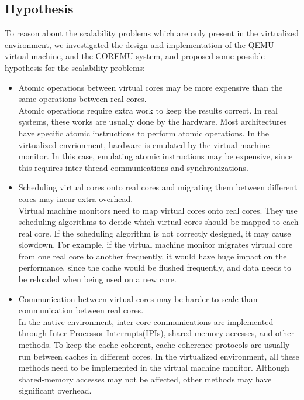 \subsection{Hypothesis}
To reason about the scalability problems which are only present in the
virtualized environment, we investigated the design and implementation
of the QEMU virtual machine, and the COREMU system, and proposed some
possible hypothesis for the scalability problems:

\begin{itemize}
	\item Atomic operations between virtual cores may be more expensive
		than the same operations between real cores.\\
		Atomic operations require extra work to keep the results correct.
		In real systems, these works are usually done by the hardware.
		Most architectures have specific atomic instructions to perform
		atomic operations. In the virtualized envrionment, hardware is
		emulated by the virtual machine monitor. In this case, emulating
		atomic instructions may be expensive, since this requires
		inter-thread communications and synchronizations.
	\item Scheduling virtual cores onto real cores and migrating them
		between different cores may incur extra overhead. \\
		Virtual machine monitors need to map virtual cores onto real cores.
		They use scheduling algorithms to decide which virtual cores should
		be mapped to each real core. If the scheduling algorithm is not
		correctly designed, it may cause slowdown. For example, if the
		virtual machine monitor migrates virtual core from one real core
		to another frequently, it would have huge impact on the performance,
		since the cache would be flushed frequently, and data needs to be
		reloaded when being used on a new core.
	\item Communication between virtual cores may be harder to scale
		than communication between real cores. \\
		In the native environment, inter-core communications are implemented
		through Inter Processor Interrupts(IPIs), shared-memory accesses,
		and other methods. To keep the cache coherent, cache coherence
		protocols are usually run between caches in different cores. In
		the virtualized environment, all these methods need to be implemented
		in the virtual machine monitor. Although shared-memory accesses may
		not be affected, other methods may have significant overhead.
\end{itemize}
